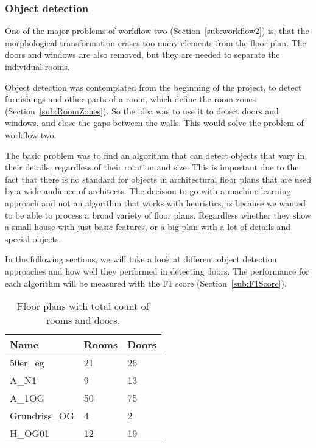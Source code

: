 \subsubsection{Object detection}
\label{sub:ObjectDetection}
One of the major problems of workflow two (Section~\ref{sub:workflow2}) is, that the morphological transformation erases too many elements from the floor plan. The doors and windows are also removed, but they are needed to separate the individual rooms.

Object detection was contemplated from the beginning of the project, to detect furnishings and other parts of a room, which define the room zones (Section~\ref{sub:RoomZones}). So the idea was to use it to detect doors and windows, and close the gaps between the walls. This would solve the problem of workflow two.

The basic problem was to find an algorithm that can detect objects that vary in their details, regardless of their rotation and size. This is important due to the fact that there is no standard for objects in architectural floor plans that are used by a wide audience of architects. The decision to go with a machine learning approach and not an algorithm that works with heuristics, is because we wanted to be able to process a broad variety of floor plans. Regardless whether they show a small house with just basic features, or a big plan with a lot of details and special objects.

In the following sections, we will take a look at different object detection approaches and how well they performed in detecting doors. The performance for each algorithm will be measured with the F1 score (Section~\ref{sub:F1Score}).

\begin{table}[H]
\centering
\caption{Floor plans with total count of rooms and doors.}
\label{tbl:FloorPlanData}
\begin{tabular}{@{}lll@{}}
\toprule
Name          & Rooms & Doors \\ \midrule
50er\_eg      & 21    & 26    \\
A\_N1         & 9     & 13    \\
A\_1OG        & 50    & 75    \\
Grundriss\_OG & 4     & 2     \\
H\_OG01       & 12    & 19    \\ \bottomrule
\end{tabular}
\end{table}

